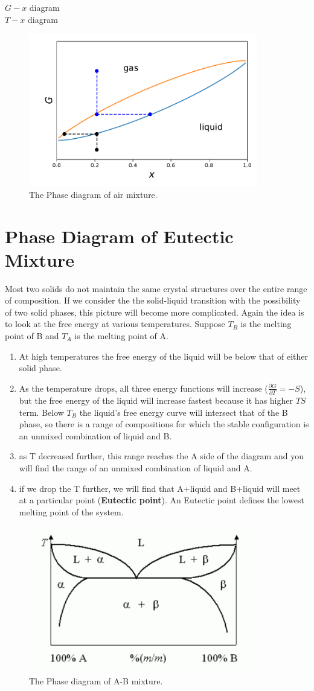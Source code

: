 $G-x$ diagram\\
$T-x$ diagram\\
\begin{figure}[ht]
\centering
\includegraphics[width=10cm]{imgs/air.pdf}
\caption{The Phase diagram of air mixture.}
\end{figure}


\section{Phase Diagram of Eutectic Mixture}
Most two solids do not maintain the same crystal structures over the entire range of composition. If we consider the the solid-liquid transition with the possibility of two solid phases, this picture will become more complicated. Again the idea is to look at the free energy at various temperatures. Suppose $T_B$ is the melting point of B and $T_A$ is the melting point of A. 

\begin{enumerate}
    \item At high temperatures the free energy of the liquid will be below that of either solid phase. 
    \item As the temperature drops, all three energy functions will increase ($\frac{\partial G}{\partial T}=-S$), but the free energy of the liquid will increase fastest because it has higher $TS$ term. Below $T_B$ the liquid's free energy curve will intersect that of the B phase, so there is a range of compositions for which the stable configuration is an unmixed combination of liquid and B. 
    \item as T decreased further, this range reaches the A side of the diagram and you will find the range of an unmixed combination of liquid and A.
    \item if we drop the T further, we will find that A+liquid and B+liquid will meet at a particular point (\textbf{Eutectic point}). An Eutectic point defines the lowest melting point of the system. 
\end{enumerate}

\begin{figure}[ht]
\centering
\includegraphics[width=10cm]{imgs/Eutectic.pdf}
\caption{The Phase diagram of A-B mixture.}
\end{figure}



